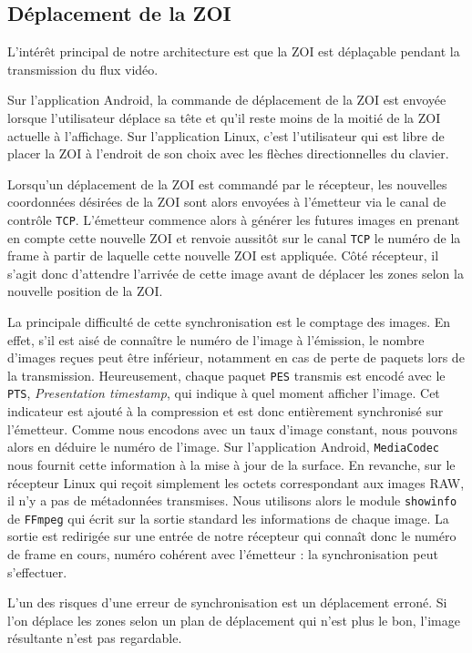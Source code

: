 \documentclass[11pt,a4paper]{article}
\begin{document}
\subsection{Déplacement de la ZOI}

L'intérêt principal de notre architecture est que la ZOI est déplaçable pendant la transmission du flux vidéo.

\bigbreak
Sur l'application Android, la commande de déplacement de la ZOI est envoyée lorsque l'utilisateur déplace sa tête et qu'il reste moins de la moitié de la ZOI actuelle à l'affichage.
Sur l'application Linux, c'est l'utilisateur qui est libre de placer la ZOI à l'endroit de son choix avec les flèches directionnelles du clavier.

\bigbreak
Lorsqu'un déplacement de la ZOI est commandé par le récepteur, les nouvelles coordonnées désirées de la ZOI sont alors envoyées à l'émetteur via le canal de contrôle \texttt{TCP}.
L'émetteur commence alors à générer les futures images en prenant en compte cette nouvelle ZOI et renvoie aussitôt sur le canal \texttt{TCP} le numéro de la frame à partir de laquelle cette nouvelle ZOI est appliquée.
Côté récepteur, il s'agit donc d'attendre l'arrivée de cette image avant de déplacer les zones selon la nouvelle position de la ZOI.

\bigbreak
La principale difficulté de cette synchronisation est le comptage des images.
En effet, s'il est aisé de connaître le numéro de l'image à l'émission, le nombre d'images reçues peut être inférieur, notamment en cas de perte de paquets lors de la transmission.
Heureusement, chaque paquet \texttt{PES} transmis est encodé avec le \texttt{PTS}, \textit{Presentation timestamp}, qui indique à quel moment afficher l'image. Cet indicateur est ajouté à la compression et est donc entièrement synchronisé sur l'émetteur.
Comme nous encodons avec un taux d'image constant, nous pouvons alors en déduire le numéro de l'image.
Sur l'application Android, \texttt{MediaCodec} nous fournit cette information à la mise à jour de la surface.
En revanche, sur le récepteur Linux qui reçoit simplement les octets correspondant aux images RAW, il n'y a pas de métadonnées transmises.
Nous utilisons alors le module \texttt{showinfo} de \texttt{FFmpeg} qui écrit sur la sortie standard les informations de chaque image. La sortie est redirigée sur une entrée de notre récepteur qui connaît donc le numéro de frame en cours, numéro cohérent avec l'émetteur : la synchronisation peut s'effectuer.

\bigbreak
L'un des risques d'une erreur de synchronisation est un déplacement erroné.
Si l'on déplace les zones selon un plan de déplacement qui n'est plus le bon, l'image résultante n'est pas regardable.
\end{document}
